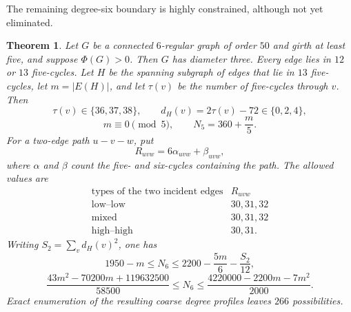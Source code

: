 \documentclass[a4paper,10pt,reqno]{amsart}
\theoremstyle{plain}
\newtheorem{theorem}{Theorem}[section]
\theoremstyle{definition}
\theoremstyle{remark}
\begin{document}
The remaining degree-six boundary is highly constrained, although not yet
eliminated.

\begin{theorem}\label{thm:order50-feasibility}
Let \(G\) be a connected \(6\)-regular graph of order \(50\) and girth
at least five, and suppose \(\Phi(G)>0\).  Then \(G\) has diameter three.
Every edge lies in \(12\) or \(13\) five-cycles.  Let \(H\) be the spanning
subgraph of edges that lie in \(13\) five-cycles, let \(m=|E(H)|\), and let
\(\tau(v)\) be
the number of five-cycles through \(v\).  Then
\[
 \tau(v)\in\{36,37,38\},
 \qquad d_H(v)=2\tau(v)-72\in\{0,2,4\},
\]
\[
 m\equiv0\pmod5,
 \qquad N_5=360+\frac m5.
\]
For a two-edge path \(u-v-w\), put
\[
 R_{uvw}=6\alpha_{uvw}+\beta_{uvw},
\]
where \(\alpha\) and \(\beta\) count the five- and six-cycles containing the
path.  The allowed values are
\[
\begin{array}{c|c}
\text{types of the two incident edges}&R_{uvw}\\
\hline
\text{low--low}&30,31,32\\
\text{mixed}&30,31,32\\
\text{high--high}&30,31.
\end{array}
\]
Writing \(S_2=\sum_vd_H(v)^2\), one has
\[
 1950-m\le N_6
 \le2200-\frac{5m}{6}-\frac{S_2}{12},
\]
\[
 \frac{43m^2-70200m+119632500}{58500}
 \le N_6
 \le\frac{4220000-2200m-7m^2}{2000}.
\]
Exact enumeration of the resulting coarse degree profiles leaves \(266\)
possibilities.
\end{theorem}
\end{document}
